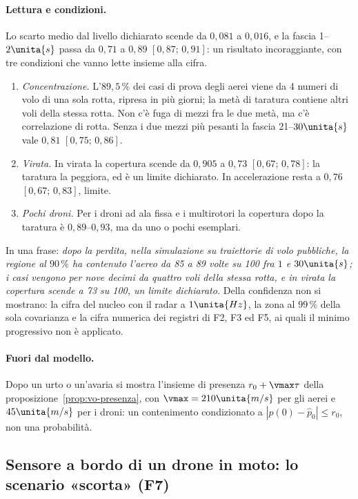 \paragraph{Lettura e condizioni.} Lo scarto medio dal livello dichiarato scende da $0{,}081$ a $0{,}016$, e la fascia 1--$2\unita{s}$ passa da $0{,}71$ a $0{,}89$ $[0{,}87;\,0{,}91]$: un risultato incoraggiante, con tre condizioni che vanno lette insieme alla cifra.
\begin{enumerate}[label=\arabic*.]
\item \emph{Concentrazione.} L'$89{,}5\,\%$ dei casi di prova degli aerei viene da 4 numeri di volo di una sola rotta, ripresa in più giorni; la metà di taratura contiene altri voli della stessa rotta. Non c'è fuga di mezzi fra le due metà, ma c'è correlazione di rotta. Senza i due mezzi più pesanti la fascia 21--$30\unita{s}$ vale $0{,}81$ $[0{,}75;\,0{,}86]$.
\item \emph{Virata.} In virata la copertura scende da $0{,}905$ a $0{,}73$ $[0{,}67;\,0{,}78]$: la taratura la peggiora, ed è un limite dichiarato. In accelerazione resta a $0{,}76$ $[0{,}67;\,0{,}83]$, limite.
\item \emph{Pochi droni.} Per i droni ad ala fissa e i multirotori la copertura dopo la taratura è $0{,}89$--$0{,}93$, ma da uno o pochi esemplari.
\end{enumerate}
In una frase: \emph{dopo la perdita, nella simulazione su traiettorie di volo pubbliche, la regione al $90\,\%$ ha contenuto l'aereo da 85 a 89 volte su 100 fra $1$ e $30\unita{s}$; i casi vengono per nove decimi da quattro voli della stessa rotta, e in virata la copertura scende a 73 su 100, un limite dichiarato.} Della confidenza non si mostrano: la cifra del nucleo con il radar a $1\unita{Hz}$, la zona al $99\,\%$ della sola covarianza e la cifra numerica dei registri di F2, F3 ed F5, ai quali il minimo progressivo non è applicato.

\paragraph{Fuori dal modello.} Dopo un urto o un'avaria si mostra l'insieme di presenza $r_0+\vmax\tau$ della proposizione~\ref{prop:vo-presenza}, con $\vmax=210\unita{m/s}$ per gli aerei e $45\unita{m/s}$ per i droni: un contenimento condizionato a $|p(0)-\hat p_0|\le r_0$, non una probabilità.

\subsection{Sensore a bordo di un drone in moto: lo scenario «scorta» (F7)}\label{sec:vo-scorta}

